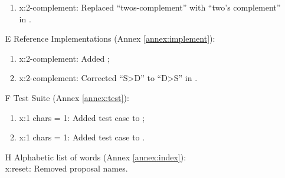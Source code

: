 \begin{itemize}
\begin{enumerate}
		\item \textsf{x:2-complement}: Replaced ``twos-complement'' with ``two's complement'' in .
		\end{enumerate}

	\item[E] Reference Implementations (Annex \ref{annex:implement}):	%
		\begin{enumerate}
		\item \textsf{x:2-complement}: Added ;

		\item \textsf{x:2-complement}: Corrected ``S>D'' to ``D>S'' in .
		\end{enumerate}

	\item[F] Test Suite (Annex \ref{annex:test}):	%
		\begin{enumerate}
		\item \textsf{x:1 chars = 1}: Added test case to ;
		\item \textsf{x:1 chars = 1}: Added test case to .
		\end{enumerate}

	\item[H] Alphabetic list of words (Annex \ref{annex:index}): ~\\
		\textsf{x:reset}: Removed proposal names.
	\end{itemize}


